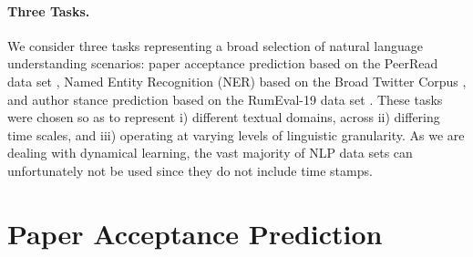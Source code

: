 \documentclass[letterpaper]{article} %
\begin{document}

\paragraph{Three Tasks.}
We consider three tasks representing a broad selection of natural language understanding scenarios: paper acceptance prediction based on the PeerRead data set \cite{kang18naacl}, Named Entity Recognition (NER) based on the Broad Twitter Corpus \cite{derczynski:2016}, and author stance prediction based on the RumEval-19 data set \cite{rumour:19}.
These tasks were chosen so as to represent i) different textual domains, across ii) differing time scales, and iii) operating at varying levels of linguistic granularity.
As we are dealing with dynamical learning, the vast majority of NLP data sets can unfortunately not be used since they do not include time stamps.

\section{Paper Acceptance Prediction}
\label{sec:peerread}
\end{document}
